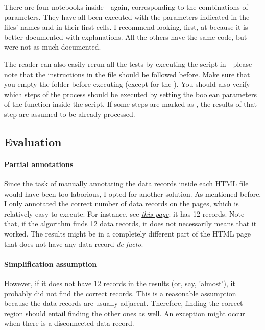 \documentclass[10pt]{article}
\newcommand{\func}[1]{\path{#1()}}
\begin{document}
There are four notebooks inside  - again, corresponding to the combinations of parameters. They have all been executed with the parameters indicated in the files' names and in their first cells. I recommend looking, first, at  because it is better documented with explanations. All the others have the same code, but were not as much documented.

The reader can also easily rerun all the tests by executing the script in  - please note that the instructions in the  file should be followed before. Make sure that you empty the  folder before executing (except for the ). You should also verify which steps of the process should be executed by setting the boolean parameters of the function \func{main} inside the script. If some steps are marked as , the results of that step are assumed to be already processed. 



\subsection{Evaluation}

\paragraph{Partial annotations} Since the task of manually annotating the data records inside each HTML file would have been too laborious, I opted for another solution. As mentioned before, I only annotated the correct number of data records on the pages, which is relatively easy to execute. For instance, see \href{https://www.circuitcity.com/products/health-personal-care-beauty.html}{\textit{this page}}: it has 12 records. Note that, if the algorithm finds 12 data records, it does not necessarily means that it worked. The results might be in a completely different part of the HTML page that does not have any data record \emph{de facto}.

\paragraph{Simplification assumption} However, if it does not have 12 records in the results (or, say, 'almost'), it probably did not find the correct records. This is a reasonable assumption because the data records are usually adjacent. Therefore, finding the correct region should entail finding the other ones as well. An exception might occur when there is a disconnected data record\footnotemark.
\end{document}
